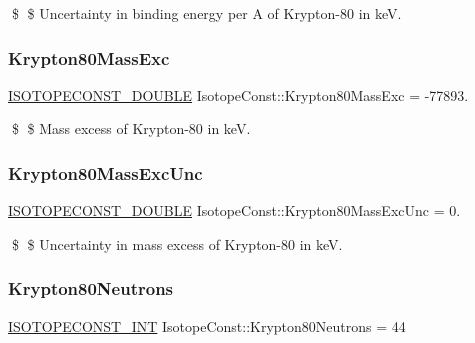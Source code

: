\$ \$ Uncertainty in binding energy per A of Krypton-\/80 in keV. \mbox{\label{group___isotope_const-_krypton-_kr80_ga494536f04d98ee39ace8985e76822139}} 
\subsubsection{\texorpdfstring{Krypton80\+Mass\+Exc}{Krypton80MassExc}}
{\footnotesize\ttfamily \mbox{\hyperlink{group___isotope_const-_macros_ga8f45a7272ce02c0b4c65c44636ed719a}{I\+S\+O\+T\+O\+P\+E\+C\+O\+N\+S\+T\+\_\+\+D\+O\+U\+B\+LE}} Isotope\+Const\+::\+Krypton80\+Mass\+Exc = -\/77893.}

\$ \$ Mass excess of Krypton-\/80 in keV. \mbox{\label{group___isotope_const-_krypton-_kr80_gaf129070edbae39637fdce2b364731877}} 
\subsubsection{\texorpdfstring{Krypton80\+Mass\+Exc\+Unc}{Krypton80MassExcUnc}}
{\footnotesize\ttfamily \mbox{\hyperlink{group___isotope_const-_macros_ga8f45a7272ce02c0b4c65c44636ed719a}{I\+S\+O\+T\+O\+P\+E\+C\+O\+N\+S\+T\+\_\+\+D\+O\+U\+B\+LE}} Isotope\+Const\+::\+Krypton80\+Mass\+Exc\+Unc = 0.}

\$ \$ Uncertainty in mass excess of Krypton-\/80 in keV. \mbox{\label{group___isotope_const-_krypton-_kr80_gaa67249f1bc6bf095c41e41ea31afff0a}} 
\subsubsection{\texorpdfstring{Krypton80\+Neutrons}{Krypton80Neutrons}}
{\footnotesize\ttfamily \mbox{\hyperlink{group___isotope_const-_macros_ga5f18360b3e99483a35c32d789e62621c}{I\+S\+O\+T\+O\+P\+E\+C\+O\+N\+S\+T\+\_\+\+I\+NT}} Isotope\+Const\+::\+Krypton80\+Neutrons = 44}

